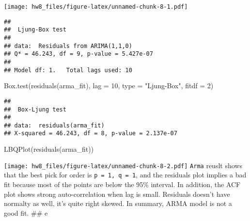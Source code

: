 \documentclass[
]{article}
\newenvironment{Shaded}{\begin{snugshade}}{\end{snugshade}}
\newcommand{\AttributeTok}[1]{\textcolor[rgb]{0.77,0.63,0.00}{#1}}
\newcommand{\DecValTok}[1]{\textcolor[rgb]{0.00,0.00,0.81}{#1}}
\newcommand{\FunctionTok}[1]{\textcolor[rgb]{0.00,0.00,0.00}{#1}}
\newcommand{\NormalTok}[1]{#1}
\newcommand{\StringTok}[1]{\textcolor[rgb]{0.31,0.60,0.02}{#1}}
\begin{document}
\texttt{[image: hw8\_files/figure-latex/unnamed-chunk-8-1.pdf]}

\begin{verbatim}
## 
##  Ljung-Box test
## 
## data:  Residuals from ARIMA(1,1,0)
## Q* = 46.243, df = 9, p-value = 5.427e-07
## 
## Model df: 1.   Total lags used: 10
\end{verbatim}

\begin{Shaded}
\begin{Highlighting}[]
\FunctionTok{Box.test}\NormalTok{(}\FunctionTok{residuals}\NormalTok{(arma\_fit), }\AttributeTok{lag =} \DecValTok{10}\NormalTok{, }\AttributeTok{type =} \StringTok{"Ljung{-}Box"}\NormalTok{, }\AttributeTok{fitdf =} \DecValTok{2}\NormalTok{)}
\end{Highlighting}
\end{Shaded}

\begin{verbatim}
## 
##  Box-Ljung test
## 
## data:  residuals(arma_fit)
## X-squared = 46.243, df = 8, p-value = 2.137e-07
\end{verbatim}

\begin{Shaded}
\begin{Highlighting}[]
\FunctionTok{LBQPlot}\NormalTok{(}\FunctionTok{residuals}\NormalTok{(arma\_fit))}
\end{Highlighting}
\end{Shaded}

\texttt{[image: hw8\_files/figure-latex/unnamed-chunk-8-2.pdf]}
\texttt{Arma} reuslt shows that the best pick for order is
\texttt{p\ =\ 1,\ q\ =\ 1}, and the residuals plot implies a bad fit
because most of the points are below the 95\% interval. In addition, the
ACF plot shows strong auto-correlation when lag is small. Residuals
doesn't have normalty as well, it's quite right skewed. In summary, ARMA
model is not a good fit. \#\# e
\end{document}

